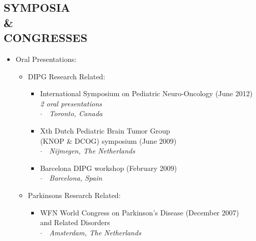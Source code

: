 \documentclass[line,margin]{res}
\newcommand{\placestyle}[1]{\footnotesize $\cdot$\ \ {\emph{#1}}}
\newcommand{\datestyle}[1]{{\tiny \dotfill} {\small (#1)}}
\begin{document}
\begin{resume}
\section{SYMPOSIA \\ \& \\ CONGRESSES}
\begin{itemize}
\item {
  Oral Presentations:
  \begin{itemize}
  \item { DIPG Research Related:
    \begin{itemize}
    \item International Symposium on Pediatric Neuro-Oncology \datestyle{June 2012}\\
      \hfill \emph{2 oral presentations} \\
      { \placestyle{Toronto, Canada} }
    \item Xth Dutch Pediatric Brain Tumor Group \\ (KNOP \& DCOG) symposium \datestyle{June 2009} \\
      { \placestyle{Nijmegen,  The Netherlands} }
    \item Barcelona DIPG workshop \datestyle{February 2009} \\
      { \placestyle{Barcelona, Spain} }
    \end{itemize}
  }
  \item { Parkinsons Research Related:
    \begin{itemize}
    \item  WFN World Congress on Parkinson's Disease \datestyle{December 2007} \\
      and Related Disorders  \\
      { \placestyle{Amsterdam, The Netherlands} }
    \end{itemize}
  }
  \end{itemize}
}
\end{itemize}


\end{resume}
\end{document}
